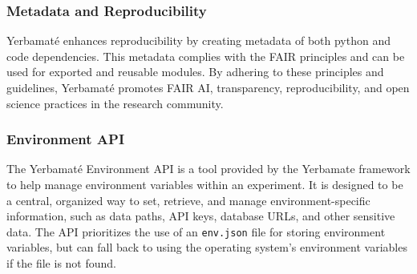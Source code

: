 
\subsubsection{Metadata and Reproducibility}

Yerbamaté enhances reproducibility by creating metadata of both python and code dependencies. This metadata complies with the FAIR principles and can be used for exported and reusable modules. By adhering to these principles and guidelines, Yerbamaté promotes FAIR AI, transparency, reproducibility, and open science practices in the research community.


\subsubsection{Environment API}

The Yerbamaté Environment API is a tool provided by the Yerbamate framework to help manage environment variables within an experiment. It is designed to be a central, organized way to set, retrieve, and manage environment-specific information, such as data paths, API keys, database URLs, and other sensitive data. The API prioritizes the use of an \texttt{env.json} file for storing environment variables, but can fall back to using the operating system's environment variables if the file is not found.


